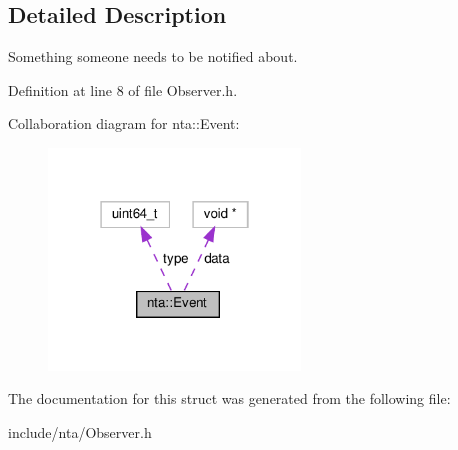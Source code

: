 \subsection{Detailed Description}
Something someone needs to be notified about. 

Definition at line 8 of file Observer.\+h.



Collaboration diagram for nta\+:\+:Event\+:\nopagebreak
\begin{figure}[H]
\begin{center}
\leavevmode
\includegraphics[width=190pt]{dd/d38/structnta_1_1Event__coll__graph}
\end{center}
\end{figure}


The documentation for this struct was generated from the following file\+:\begin{DoxyCompactItemize}
\item 
include/nta/Observer.\+h\end{DoxyCompactItemize}
